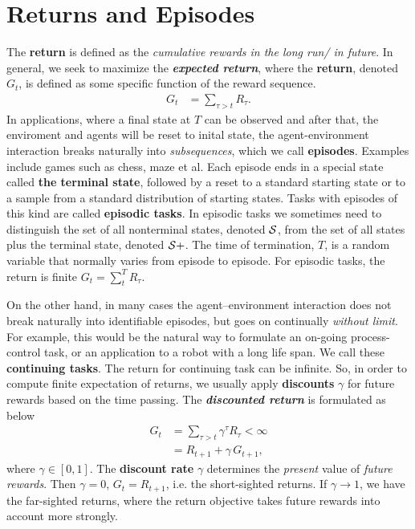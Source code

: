 \documentclass[11pt]{article}
\begin{document}
\section{Returns and Episodes}
The \textbf{return} is defined as the \emph{cumulative rewards in the long run/ in future}. In general, we seek to maximize the \textbf{\emph{expected return}}, where the \textbf{return}, denoted $G_t$, is
defined as some specific function of the reward sequence. 
\begin{align*}
G_{t} &= \sum_{\tau > t}R_{\tau}.
\end{align*}
In applications, where a final state at $T$ can be observed and after that, the enviroment and agents will be reset to inital state,  the agent-environment interaction breaks naturally into \emph{subsequences}, which we call \textbf{episodes}. Examples include games such as chess, maze et al. Each episode ends in a special
state called \textbf{the terminal state}, followed by a reset to a standard starting state or to a sample from a standard distribution of starting states. Tasks
with episodes of this kind are called \textbf{episodic tasks}. In episodic tasks we sometimes need to distinguish the set of all nonterminal states, denoted ${\mathcal S}$, from the set of all states plus the terminal state, denoted ${\mathcal S}+$. The time of termination, $T$, is a random variable that normally varies from episode to episode. For episodic tasks,  the return is finite $G_{t} = \sum_{t}^{T}R_{\tau}$.

On the other hand, in many cases the agent–environment interaction does not break naturally into identifiable episodes, but goes on continually \emph{without limit}. For example, this would be the natural way to formulate an on-going process-control task, or an application to a robot with a long life span. We call these \textbf{continuing tasks}. The return for continuing task can be infinite. So, in order to compute finite expectation of returns, we usually apply \textbf{discounts} $\gamma$ for future rewards based on the time passing. The \textbf{\emph{discounted return}} is formulated as below
\begin{align}
G_{t} &= \sum_{\tau > t}\gamma^{\tau}R_{\tau} < \infty \nonumber\\
&= R_{t+1} + \gamma\,G_{t+1}, \label{eqn: discount_return}
\end{align} where $\gamma \in [0,1]$. The \textbf{discount rate} $\gamma$ determines the \emph{present} value of \emph{future rewards}. Then $\gamma =0$, $G_{t} = R_{t+1}$, i.e. the short-sighted returns. If $\gamma \rightarrow 1$, we have the far-sighted returns, where the return objective takes future rewards into account more strongly. 
\end{document}
